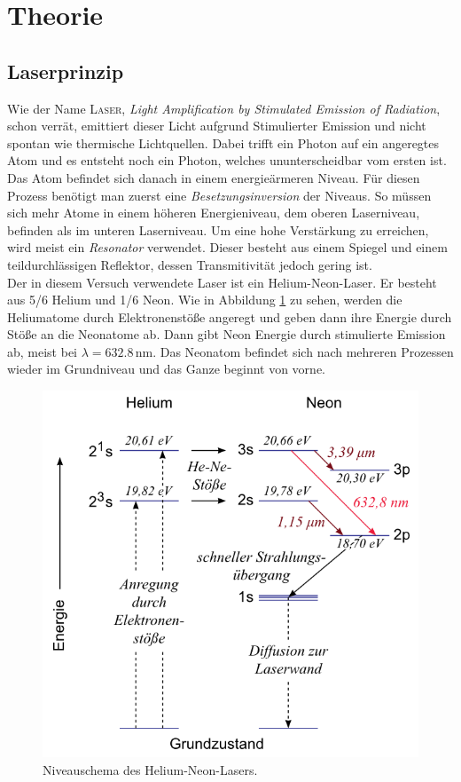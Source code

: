 \documentclass[12pt,a4paper,titlepage,headinclude,bibtotoc]{scrartcl}
\begin{document}
\section{Theorie}
\label{sec:theorie}
\subsection{Laserprinzip}
Wie der Name \textsc{Laser}, \textit{Light Amplification by Stimulated Emission of Radiation}, schon verrät, emittiert dieser Licht aufgrund Stimulierter Emission und nicht spontan wie thermische Lichtquellen.
Dabei trifft ein Photon auf ein angeregtes Atom und es entsteht noch ein Photon, welches ununterscheidbar vom ersten ist.
Das Atom befindet sich danach in einem energieärmeren Niveau.
Für diesen Prozess benötigt man zuerst eine \emph{Besetzungsinversion} der Niveaus.
So müssen sich mehr Atome in einem höheren Energieniveau, dem oberen Laserniveau, befinden als im unteren Laserniveau.
Um eine hohe Verstärkung zu erreichen, wird meist ein \emph{Resonator} verwendet.
Dieser besteht aus einem Spiegel und einem teildurchlässigen Reflektor, dessen Transmitivität jedoch gering ist.\\
Der in diesem Versuch verwendete Laser ist ein Helium-Neon-Laser.
Er besteht aus 5/6 Helium und 1/6 Neon.
Wie in Abbildung \ref{fig:HeNe} zu sehen, werden die Heliumatome durch Elektronenstöße angeregt und geben dann ihre Energie durch Stöße an die Neonatome ab.
Dann gibt Neon Energie durch stimulierte Emission ab, meist bei $\lambda=632.8\,$nm.
Das Neonatom befindet sich nach mehreren Prozessen wieder im Grundniveau und das Ganze beginnt von vorne.

\begin{figure}[!h]
	\centering
	\includegraphics[scale=0.5]{NiveauHeNe.png}
	\caption{Niveauschema des Helium-Neon-Lasers. \cite[Datum: 02.01.15]{LP21}}
	\label{fig:HeNe}
\end{figure}
\end{document}

